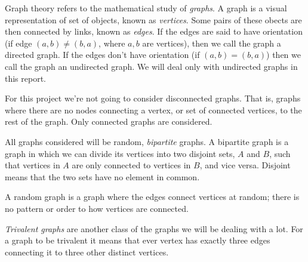 \documentclass[pdftex,12pt,a4paper]{article}
\begin{document}
Graph theory refers to the mathematical study of \emph{graphs}. A graph is a visual representation of set of objects, known as \emph{vertices}. Some pairs of these obects are then connected by links, known as \emph{edges}. If the edges are said to have orientation (if edge $(a, b) \neq (b, a)$, where $a, b$ are vertices), then we call the graph a directed graph. If the edges don't have orientation (if $(a,b)=(b,a)$) then we call the graph an undirected graph. We will deal only with undirected graphs in this report.

For this project we're not going to consider disconnected graphs. That is, graphs where there are no nodes connecting a vertex, or set of connected vertices, to the rest of the graph. Only connected graphs are considered.

All graphs considered will be random, \emph{bipartite} graphs. A bipartite graph is a graph in which we can divide its vertices into two disjoint sets, $A$ and $B$, such that vertices in $A$ are only connected to vertices in $B$, and vice versa. Disjoint means that the two sets have no element in common.

A random graph is a graph where the edges connect vertices at random; there is no pattern or order to how vertices are connected.

\emph{Trivalent graphs} are another class of the graphs we will be dealing with a lot. For a graph to be trivalent it means that ever vertex has exactly three edges connecting it to three other distinct vertices.
\end{document}
